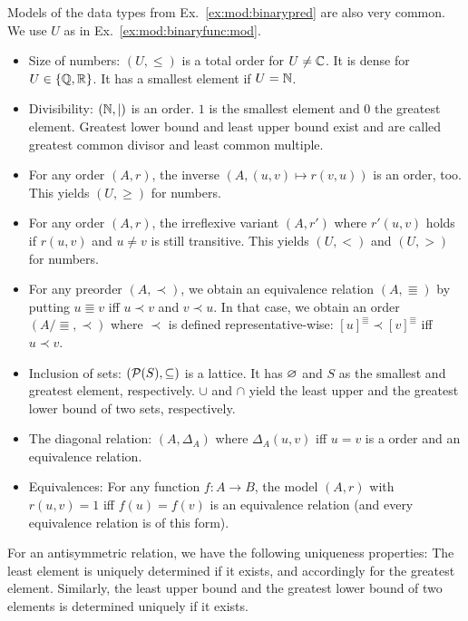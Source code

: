 \begin{example}\label{ex:mod:binarypred:mod}
Models of the data types from Ex.~\ref{ex:mod:binarypred} are also very common.
We use $U$ as in Ex.~\ref{ex:mod:binaryfunc:mod}.

\begin{itemize}
\item Size of numbers: $(U,\leq)$ is a total order for $U\neq \mathbb{C}$. It is dense for $U\in\{\mathbb{Q},\mathbb{R}\}$. It has a smallest element if $U=\mathbb{N}$.
\item Divisibility: $(\mathbb{N},|)$ is an order. $1$ is the smallest element and $0$ the greatest element. Greatest lower bound and least upper bound exist and are called greatest common divisor and least common multiple.
\item For any order $(A,r)$, the inverse $(A,(u,v)\mapsto r(v,u))$ is an order, too. This yields $(U,\geq)$ for numbers.
\item For any order $(A,r)$, the irreflexive variant $(A,r')$ where $r'(u,v)$ holds if $r(u,v)$ and $u\neq v$ is still transitive. This yields $(U,<)$ and $(U,>)$ for numbers.
\item For any preorder $(A,\prec)$, we obtain an equivalence relation $(A,\Equiv)$ by putting $u\Equiv v$ iff $u\prec v$ and $v\prec u$.
  In that case, we obtain an order $(A/\Equiv,\prec)$ where $\prec$ is defined representative-wise: $[u]^\Equiv\prec [v]^\Equiv$ iff $u\prec v$.
\item Inclusion of sets: $(\mathcal{P}(S),\subseteq)$ is a lattice. It has $\varnothing$ and $S$ as the smallest and greatest element, respectively. $\cup$ and $\cap$ yield the least upper and the greatest lower bound of two sets, respectively.
\item The diagonal relation: $(A,\Delta_A)$ where $\Delta_A(u,v)$ iff $u=v$ is a order and an equivalence relation.
\item Equivalences: For any function $f:A\to B$, the model $(A,r)$ with $r(u,v)=1$ iff $f(u)=f(v)$ is an equivalence relation (and every equivalence relation is of this form).
\end{itemize}
\end{example}


\begin{remark}[Uniqueness]\label{rem:binarypred:unique}
For an antisymmetric relation, we have the following uniqueness properties: The least element is uniquely determined if it exists, and accordingly for the greatest element.
Similarly, the least upper bound and the greatest lower bound of two elements is determined uniquely if it exists.
\end{remark}

